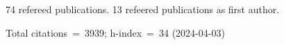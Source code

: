 74 refereed publications. 13 refeered publications as first author.

Total citations~=~3939; h-index~=~34 (2024-04-03)